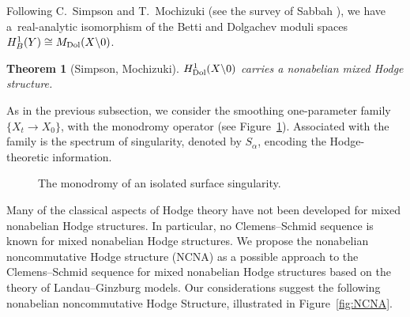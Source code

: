 \documentclass[pdftex]{sigma}
\newtheorem{Theorem}{Theorem}[section]
\begin{document}
Following C.~Simpson \cite{Sim97} and T.~Mochizuki (see the survey of Sabbah \cite{Sab11}), we have a~real-analytic isomorphism of the Betti and Dolgachev moduli spaces
$H^1_B (Y) \cong M_{\rm Dol}(X {\setminus} 0)$.

\begin{Theorem}[Simpson, Mochizuki]
	$H^1_{\rm Dol}(X {\setminus} 0)$ carries a nonabelian mixed Hodge structure.
\end{Theorem}

As in the previous subsection, we consider the smoothing one-parameter family
$
	\{X_t \to X_0\}$,
with the monodromy operator (see Figure~\ref{fig:monodromy}). Associated with the family is the spectrum of singularity, denoted by $S_{\alpha}$, encoding the Hodge-theoretic information.

\begin{figure}[ht]
	\centering
	\caption{The monodromy of an isolated surface singularity.}
	\label{fig:monodromy}
\end{figure}


Many of the classical aspects of Hodge theory have not been developed for mixed nonabelian Hodge structures. In particular, no Clemens--Schmid sequence is known for mixed nonabelian Hodge structures. We propose the nonabelian noncommutative Hodge structure (NCNA) as a possible approach to the Clemens--Schmid sequence for mixed nonabelian Hodge structures based on the theory of Landau--Ginzburg models. Our considerations suggest the following nonabelian noncommutative Hodge Structure, illustrated in Figure~\ref{fig:NCNA}.
\end{document}
